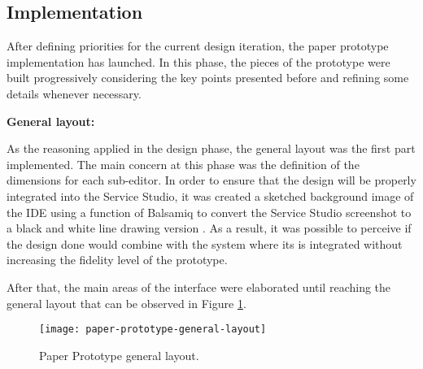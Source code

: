 


\subsection{Implementation}
\label{subsec:paper_prototype_implementation}

After defining priorities for the current design iteration, the paper prototype implementation has launched. In this phase, the pieces of the prototype were built progressively considering the key points presented before and refining some details whenever necessary.

\medskip

\textbf{General layout:}

\medskip

As the reasoning applied in the design phase, the general layout was the first part implemented. The main concern at this phase was the definition of the dimensions for each sub-editor. In order to ensure that the design will be properly integrated into the Service Studio, it was created a sketched background image of the \gls{IDE} using a function of Balsamiq \cite{balsamiq} to convert the Service Studio screenshot to a black and white line drawing version \cite{balsamiq_using_images_and_assets}. As a result, it was possible to perceive if the design done would combine with the system where its is integrated without increasing the fidelity level of the prototype.

After that, the main areas of the interface were elaborated until reaching the general layout that can be observed in Figure \ref{fig:paperPrototypeGeneralLayout}.

\begin{figure}[htbp]
	\centering
	\texttt{[image: paper-prototype-general-layout]}
	\caption{Paper Prototype general layout.}
	\label{fig:paperPrototypeGeneralLayout}
\end{figure}

